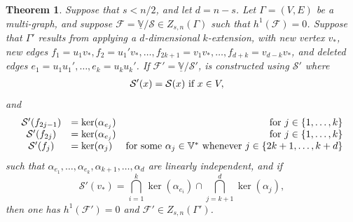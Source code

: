 \documentclass{article}
\newtheorem{theorem}{Theorem}[section]
\theoremstyle{definition}
\theoremstyle{remark}
\begin{document}
\begin{theorem}\label{Extension-for-sheaves}
    Suppose that $s < n/2$, and let $d = n-s$.
    Let $\Gamma =(V, E)$ be a multi-graph, and suppose $\mathcal{F} = \underline{\mathbb{V}}/\mathcal{S} \in Z_{s, n}(\Gamma)$ such that $h^{1}(\mathcal{F}) = 0$. Suppose that $\Gamma'$ results from applying a $d$-dimensional $k$-extension, with new vertex $v_{*}$, new edges $f_{1} =u_{1}v_{*}, f_{2}=u_{1}'v_{*},\dots, f_{2k +1}=v_{1}v_*, \dots, f_{d+k}=v_{d-k}v_*$,  and deleted edges $e_1=u_1u_1',\dots, e_k=u_ku_k'$. If $\mathcal{F}' = \underline{\mathbb{V}}/ \mathcal{S}'$, is constructed using $\mathcal{S}'$ where 
    \begin{align*}
        \mathcal{S}'(x) &= \mathcal{S}(x) \textup{ if }  x\in V,
    \end{align*}
    and
    \begin{equation*}
    \begin{array}{clr}
        \mathcal{S}'(f_{2j -1}) &= \ker(\alpha_{e_j})  &\textup{for $j \in\{1, \dots, k\}$}\\
        \mathcal{S}'(f_{2j}) &= \ker(\alpha_{e_j})  &\textup{for $j \in\{1, \dots, k\}$}\\
        \mathcal{S}'(f_{j}) &= \ker(\alpha_{j}) &\textup{for some $\alpha_{j} \in \mathbb{V}^{*}$ whenever $j \in\{2k+1, \dots, k + d\}$}
        \end{array}
    \end{equation*}
    such that $\alpha_{e_1}, \dots, \alpha_{e_k}, \alpha_{k+1},\dots,\alpha_{d}$ are linearly independent, and if $$\mathcal{S}'(v_*) = \bigcap_{i=1}^{k}  \ker(\alpha_{e_i}) \cap  \bigcap_{j=k+1}^{d}  \ker(\alpha_{j}),$$ then one has $h^{1}(\mathcal{F}') = 0$ and $\mathcal{F}'\in Z_{s, n}(\Gamma')$. 
\end{theorem}
\end{document}
